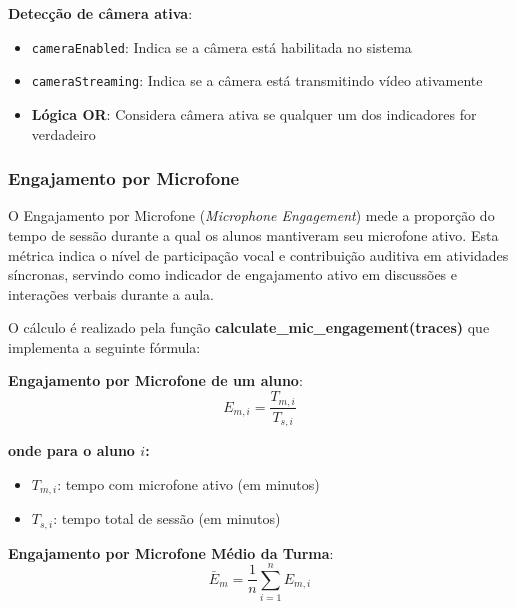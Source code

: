 \textbf{Detecção de câmera ativa}:
\begin{itemize}
    \item \texttt{cameraEnabled}: Indica se a câmera está habilitada no sistema
    \item \texttt{cameraStreaming}: Indica se a câmera está transmitindo vídeo ativamente
    \item \textbf{Lógica OR}: Considera câmera ativa se qualquer um dos indicadores for verdadeiro
\end{itemize}


\subsubsection{Engajamento por Microfone}
O Engajamento por Microfone (\textit{Microphone Engagement}) mede a proporção do tempo de sessão durante a qual os alunos mantiveram seu microfone ativo. Esta métrica indica o nível de participação vocal e contribuição auditiva em atividades síncronas, servindo como indicador de engajamento ativo em discussões e interações verbais durante a aula.

O cálculo é realizado pela função \textbf{calculate\_mic\_engagement(traces)} que implementa a seguinte fórmula:

\textbf{Engajamento por Microfone de um aluno}:
\begin{equation}
E_{m,i} = \frac{T_{m,i}}{T_{s,i}}
\end{equation}

\textbf{onde para o aluno $i$:}
\begin{itemize}
    \item $T_{m,i}$: tempo com microfone ativo (em minutos)
    \item $T_{s,i}$: tempo total de sessão (em minutos)
\end{itemize}

\textbf{Engajamento por Microfone Médio da Turma}:
\begin{equation}
\bar{E}_m = \frac{1}{n} \sum_{i=1}^{n} E_{m,i}
\end{equation}


% 

